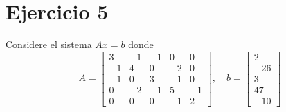
\section*{Ejercicio 5}
Considere el sistema $Ax = b$ donde
\[
A = \begin{bmatrix} 3 & -1 & -1 & 0 & 0 \\ -1 & 4 & 0 & -2 & 0 \\ -1 & 0 & 3 & -1 & 0 \\ 0 & -2 & -1 & 5 & -1 \\ 0 & 0 & 0 & -1 & 2 \end{bmatrix}, \quad b = \begin{bmatrix} 2 \\ -26 \\ 3 \\ 47 \\ -10 \end{bmatrix}
\]
